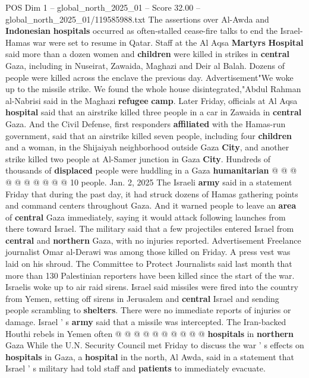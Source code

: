 \begin{textsample}{POS Dim 1 – global\_north\_2025\_01 – Score 32.00 – global\_north\_2025\_01/119585988.txt}  \label{ex:f1_pos_367}
The assertions over Al-Awda and \textbf{Indonesian} \textbf{hospitals} occurred as often-stalled cease-fire talks to end the Israel-Hamas war were set to resume in Qatar.
Staff at the Al Aqsa \textbf{Martyrs} \textbf{Hospital} said more than a dozen women and \textbf{children} were killed in strikes in \textbf{central} Gaza, including in Nuseirat, Zawaida, Maghazi and Deir al Balah.
Dozens of people were killed across the enclave the previous day.
Advertisement"We woke up to the missile strike.
We found the whole house disintegrated,"Abdul Rahman al-Nabrisi said in the Maghazi \textbf{refugee} \textbf{camp}.
Later Friday, officials at Al Aqsa \textbf{hospital} said that an airstrike killed three people in a car in Zawaida in \textbf{central} Gaza.
And the Civil Defense, first responders \textbf{affiliated} with the Hamas-run government, said that an airstrike killed seven people, including four \textbf{children} and a woman, in the Shijaiyah neighborhood outside Gaza \textbf{City}, and another strike killed two people at Al-Samer junction in Gaza \textbf{City}.
Hundreds of thousands of \textbf{displaced} people were huddling in a Gaza \textbf{humanitarian} @ @ @ @ @ @ @ @ @ @ 10 people.
Jan. 2, 2025 The Israeli \textbf{army} said in a statement Friday that during the past day, it had struck dozens of Hamas gathering points and command centers throughout Gaza.
And it warned people to leave an \textbf{area} of \textbf{central} Gaza immediately, saying it would attack following launches from there toward Israel.
The military said that a few projectiles entered Israel from \textbf{central} and \textbf{northern} Gaza, with no injuries reported.
Advertisement Freelance journalist Omar al-Derawi was among those killed on Friday.
A press vest was laid on his shroud.
The Committee to Protect Journalists said last month that more than 130 Palestinian reporters have been killed since the start of the war.
Israelis woke up to air raid sirens.
Israel said missiles were fired into the country from Yemen, setting off sirens in Jerusalem and \textbf{central} Israel and sending people scrambling to \textbf{shelters}.
There were no immediate reports of injuries or damage.
Israel ' s \textbf{army} said that a missile was intercepted.
The Iran-backed Houthi rebels in Yemen often @ @ @ @ @ @ @ @ @ @ \textbf{hospitals} in \textbf{northern} Gaza While the U.N.
Security Council met Friday to discuss the war ' s effects on \textbf{hospitals} in Gaza, a \textbf{hospital} in the north, Al Awda, said in a statement that Israel ' s military had told staff and \textbf{patients} to immediately evacuate.

\end{textsample}
